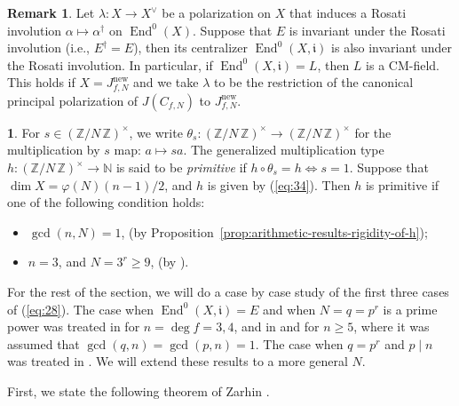 \documentclass{amsart}[11pt]
\theoremstyle{definition}
\newtheorem{rem}[thm]{Remark}
\newtheorem{sect}[thm]{}
\numberwithin{equation}{section}
\theoremstyle{notitle}
\begin{document}
\begin{rem}
  Let $\lambda: X\to X^\vee$ be a polarization on $X$ that induces a
  Rosati involution $\alpha \mapsto \alpha^\dagger$ on
  $\operatorname{End}^0(X)$. Suppose that $E$ is invariant under the Rosati
  involution (i.e., $E^\dagger =E$), then its centralizer $\operatorname{End}^0(X,
  {\mathfrak{i}})$ is also invariant under the Rosati involution. In particular,
  if $\operatorname{End}^0(X, {\mathfrak{i}})=L$, then $L$ is a CM-field. This holds if
  $X=J_{f,N}^{\mathrm{new}}$ and we take $\lambda$ to be the restriction of the
  canonical principal polarization of $J(C_{f,N})$ to $J_{f,N}^{\mathrm{new}}$. 
\end{rem}

\begin{sect}\label{subsec:multiplication-type-primitive}
  For $s\in {(\mathbb{Z}/ {N}\, \mathbb{Z})^\times}$, we write $\theta_s: {(\mathbb{Z}/ {N}\, \mathbb{Z})^\times}\to {(\mathbb{Z}/ {N}\, \mathbb{Z})^\times}$ for
  the multiplication by $s$ map: $a\mapsto sa$. The generalized
  multiplication type $h:{(\mathbb{Z}/ {N}\, \mathbb{Z})^\times}\to {\mathbb{N}}$ is said to be
  \textit{primitive} if $h\circ \theta_s = h \Leftrightarrow s=1$.
  Suppose that $\dim X= \varphi(N)(n-1)/2$, and $h$ is given by
  (\ref{eq:34}). Then $h$ is primitive if one of the following
  condition holds: 
  \begin{itemize}
  \item $\gcd(n, N)=1$,
    (by Proposition~\ref{prop:arithmetic-results-rigidity-of-h});
  \item $n=3$, and $N=3^r\geq 9$, (by \cite[Lemma 4.2]{xue_JNT}).
  \end{itemize}
\end{sect}

For the rest of the section, we will do a case by case study of the
first three cases of (\ref{eq:28}). The case when $\operatorname{End}^0(X, {\mathfrak{i}})=E$
and when $N=q=p^r$ is a prime power was treated in \cite{MR2349666} for
$n=\deg f=3,4$, and in \cite{MR2166091} and \cite{MR2471095} for
$n\geq 5$, where it was assumed that $\gcd(q,n)=\gcd(p,n)=1$. The case
when $q=p^r$ and $p\mid n$ was treated in \cite{xue_JNT}. We will
extend these results to a more general $N$.

First, we state the following theorem of Zarhin \cite[Theorem
2.3]{MR2040573}.
\end{document}
